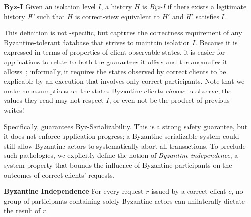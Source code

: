 \par \textbf{Byz-I} Given an isolation level $I$,
a history $H$ is \textit{Byz-I} if there exists a legitimate history \textit{H'} such that $H$ is correct-view equivalent to $H'$ and $H'$ satisfies $I$.


This definition is not \sys-specific, but captures the correctness requirement of any Byzantine-tolerant database that strives to maintain isolation $I$. Because it is expressed in terms of properties of client-observable states, it is easier for applications to relate to both the guarantees it offers and the anomalies it allows~\cite{crooks17seeing}; informally, it requires the states observed by correct clients to be explicable by an execution that involves only correct participants. Note that we make no assumptions on the states  Byzantine clients \textit{choose} to observe; the values they read may not respect $I$, or even not be the product of previous writes!


Specifically, \sys{} guarantees Byz-Serializability.  This is a strong safety guarantee, but it does not enforce application progress; a Byzantine serializable system could still allow Byzantine actors to systematically abort all transactions. To preclude such pathologies, we explicitly define the notion of \textit{Byzantine independence}, a %
system property that bounds the influence of Byzantine participants on the outcomes of correct clients' requests.


 \par \textbf{Byzantine Independence} For every request $r$ issued by a correct client $c$,  no group of participants containing solely Byzantine actors can unilaterally dictate the result of $r$.


